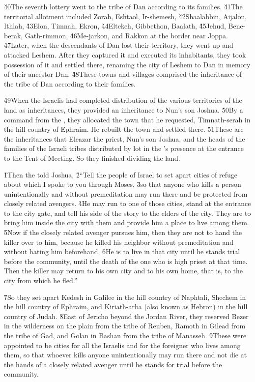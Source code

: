 \v{40}The seventh lottery went to the tribe of Dan according to its families. \v{41}The territorial allotment included Zorah, Eshtaol, Ir-shemesh, \v{42}Shaalabbin, Aijalon, Ithlah, \v{43}Elon, Timnah, Ekron, \v{44}Eltekeh, Gibbethon, Baalath, \v{45}Jehud, Bene-berak, Gath-rimmon, \v{46}Me-jarkon, and Rakkon at the border near Joppa. \v{47}Later, when the descendants of Dan lost their territory, they went up and attacked Leshem. After they captured it and executed its inhabitants, they took possession of it and settled there, renaming the city of Leshem to Dan in memory of their ancestor Dan. \v{48}These towns and villages comprised the inheritance of the tribe of Dan according to their families.

\v{49}When the Israelis had completed distribution of the various territories of the land as inheritances, they provided an inheritance to Nun's son Joshua. \v{50}By a command from the , they allocated the town that he requested, Timnath-serah in the hill country of Ephraim. He rebuilt the town and settled there. \v{51}These are the inheritances that Eleazar the priest, Nun's son Joshua, and the heads of the families of the Israeli tribes distributed by lot in the 's presence at the entrance to the Tent of Meeting. So they finished dividing the land.

\v{1}Then the  told Joshua, \v{2}``Tell the people of Israel to set apart cities of refuge about which I spoke to you through Moses, \v{3}so that anyone who kills a person unintentionally and without premeditation may run there and be protected from closely related avengers. \v{4}He may run to one of those cities, stand at the entrance to the city gate, and tell his side of the story to the elders of the city. They are to bring him inside the city with them and provide him a place to live among them. \v{5}Now if the closely related avenger pursues him, then they are not to hand the killer over to him, because he killed his neighbor without premeditation and without hating him beforehand. \v{6}He is to live in that city until he stands trial before the community, until the death of the one who is high priest at that time. Then the killer may return to his own city and to his own home, that is, to the city from which he fled.''

\v{7}So they set apart Kedesh in Galilee in the hill country of Naphtali, Shechem in the hill country of Ephraim, and Kiriath-arba (also known as Hebron) in the hill country of Judah. \v{8}East of Jericho beyond the Jordan River, they reserved Bezer in the wilderness on the plain from the tribe of Reuben, Ramoth in Gilead from the tribe of Gad, and Golan in Bashan from the tribe of Manasseh. \v{9}These were appointed to be cities for all the Israelis and for the foreigner who lives among them, so that whoever kills anyone unintentionally may run there and not die at the hands of a closely related avenger until he stands for trial before the community.

